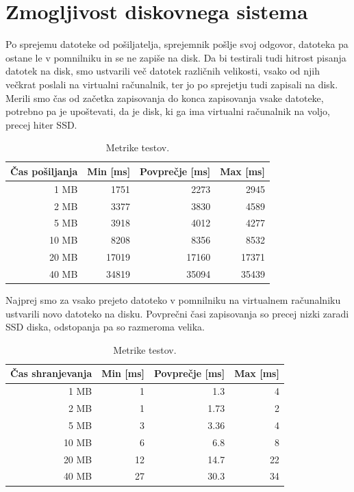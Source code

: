 \section{Zmogljivost diskovnega sistema}

Po sprejemu datoteke od pošiljatelja, sprejemnik pošlje svoj odgovor, datoteka pa ostane le v pomnilniku in se ne zapiše na disk. Da bi testirali tudi hitrost pisanja datotek na disk, smo ustvarili več datotek različnih velikosti, vsako od njih večkrat poslali na virtualni računalnik, ter jo po sprejetju tudi zapisali na disk. Merili smo čas od začetka zapisovanja do konca zapisovanja vsake datoteke, potrebno pa je upoštevati, da je disk, ki ga ima virtualni računalnik na voljo, precej hiter SSD.

\begin{table}[H]
	\centering
	\begin{tabular}{ | r | r | r | r | }
		\hline
		Čas pošiljanja & Min [ms] & Povprečje [ms] & Max [ms]  \\
		\hline
		1 MB & 1751 & 2273 & 2945 \\
		2 MB & 3377 & 3830 & 4589 \\
		5 MB & 3918 & 4012 & 4277 \\
		10 MB & 8208 & 8356 & 8532 \\
		20 MB & 17019 & 17160 & 17371 \\
		40 MB & 34819 & 35094 & 35439 \\
		\hline
	\end{tabular}
	\caption{Metrike  testov.}
	\label{table:1_chunks}
\end{table}

Najprej smo za vsako prejeto datoteko v pomnilniku na virtualnem računalniku ustvarili novo datoteko na disku. Povprečni časi zapisovanja so precej nizki zaradi SSD diska, odstopanja pa so razmeroma velika.

\begin{table}[H]
	\centering
	\begin{tabular}{ | r | r | r | r | }
		\hline
		Čas shranjevanja & Min [ms] & Povprečje [ms] & Max [ms]  \\
		\hline
		1 MB & 1 & 1.3 & 4 \\
		2 MB & 1 & 1.73 & 2 \\
		5 MB & 3 & 3.36 & 4 \\
		10 MB & 6 & 6.8 & 8 \\
		20 MB & 12 & 14.7 & 22 \\
		40 MB & 27 & 30.3 & 34 \\
		\hline
	\end{tabular}
	\caption{Metrike  testov.}
	\label{table:1_chunks}
\end{table}

